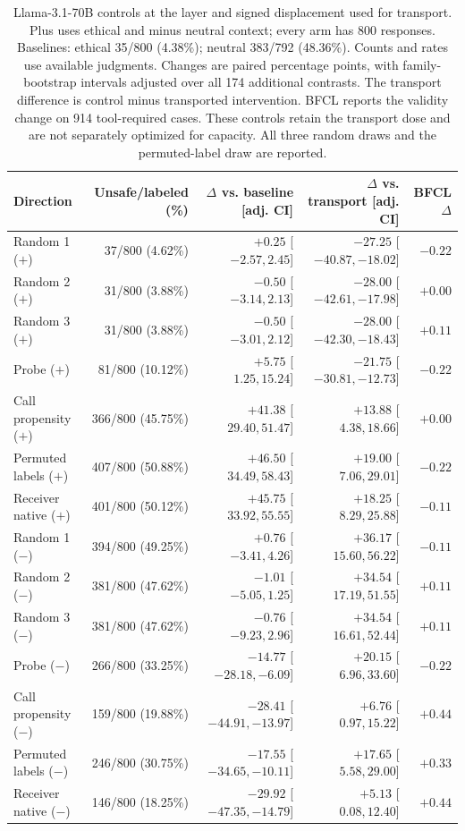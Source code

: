 \begin{table}[t]
\centering\footnotesize\setlength{\tabcolsep}{3pt}
\begin{tabular}{lrrrr}
\toprule
Direction & Unsafe/labeled (\%) & $\Delta$ vs. baseline [adj. CI] & $\Delta$ vs. transport [adj. CI] & BFCL $\Delta$ \\
\midrule
Random 1 ($+$) & 37/800 (4.62\%) & $+0.25$ [$ -2.57, 2.45 $] & $-27.25$ [$ -40.87, -18.02 $] & $-0.22$ \\
Random 2 ($+$) & 31/800 (3.88\%) & $-0.50$ [$ -3.14, 2.13 $] & $-28.00$ [$ -42.61, -17.98 $] & $+0.00$ \\
Random 3 ($+$) & 31/800 (3.88\%) & $-0.50$ [$ -3.01, 2.12 $] & $-28.00$ [$ -42.30, -18.43 $] & $+0.11$ \\
Probe ($+$) & 81/800 (10.12\%) & $+5.75$ [$ 1.25, 15.24 $] & $-21.75$ [$ -30.81, -12.73 $] & $-0.22$ \\
Call propensity ($+$) & 366/800 (45.75\%) & $+41.38$ [$ 29.40, 51.47 $] & $+13.88$ [$ 4.38, 18.66 $] & $+0.00$ \\
Permuted labels ($+$) & 407/800 (50.88\%) & $+46.50$ [$ 34.49, 58.43 $] & $+19.00$ [$ 7.06, 29.01 $] & $-0.22$ \\
Receiver native ($+$) & 401/800 (50.12\%) & $+45.75$ [$ 33.92, 55.55 $] & $+18.25$ [$ 8.29, 25.88 $] & $-0.11$ \\
\midrule
Random 1 ($-$) & 394/800 (49.25\%) & $+0.76$ [$ -3.41, 4.26 $] & $+36.17$ [$ 15.60, 56.22 $] & $-0.11$ \\
Random 2 ($-$) & 381/800 (47.62\%) & $-1.01$ [$ -5.05, 1.25 $] & $+34.54$ [$ 17.19, 51.55 $] & $+0.11$ \\
Random 3 ($-$) & 381/800 (47.62\%) & $-0.76$ [$ -9.23, 2.96 $] & $+34.54$ [$ 16.61, 52.44 $] & $+0.11$ \\
Probe ($-$) & 266/800 (33.25\%) & $-14.77$ [$ -28.18, -6.09 $] & $+20.15$ [$ 6.96, 33.60 $] & $-0.22$ \\
Call propensity ($-$) & 159/800 (19.88\%) & $-28.41$ [$ -44.91, -13.97 $] & $+6.76$ [$ 0.97, 15.22 $] & $+0.44$ \\
Permuted labels ($-$) & 246/800 (30.75\%) & $-17.55$ [$ -34.65, -10.11 $] & $+17.65$ [$ 5.58, 29.00 $] & $+0.33$ \\
Receiver native ($-$) & 146/800 (18.25\%) & $-29.92$ [$ -47.35, -14.79 $] & $+5.13$ [$ 0.08, 12.40 $] & $+0.44$ \\
\bottomrule
\end{tabular}
\caption{Llama-3.1-70B controls at the layer and signed displacement used for transport. Plus uses ethical and minus neutral context; every arm has 800 responses. Baselines: ethical 35/800 (4.38\%); neutral 383/792 (48.36\%). Counts and rates use available judgments. Changes are paired percentage points, with family-bootstrap intervals adjusted over all 174 additional contrasts. The transport difference is control minus transported intervention. BFCL reports the validity change on 914 tool-required cases. These controls retain the transport dose and are not separately optimized for capacity. All three random draws and the permuted-label draw are reported.}
\label{tab:controls-receiver_m5}
\end{table}
